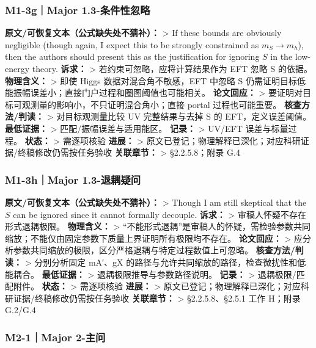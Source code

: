 \documentclass[
]{article}
\begin{document}
\subsubsection{M1-3g｜Major
1.3-条件性忽略}\label{m1-3gmajor-1.3-ux6761ux4ef6ux6027ux5ffdux7565}

\textbf{原文/可恢复文本（公式缺失处不猜补）：} \textgreater{} If these
bounds are obviously negligible (though again, I expect this to be
strongly constrained as \(m_S\to m_h\)), then the authors should present
this as the justification for ignoring \(S\) in the low-energy theory.
\textbf{诉求：} \textgreater{} 若约束可忽略，应将计算结果作为 EFT 忽略 S
的依据。 \textbf{物理含义：} \textgreater{} 即使 Higgs
数据对混合角不敏感，EFT 中忽略 S
仍需证明目标低能振幅误差小；直接门户过程和圈图阈值也可能相关。
\textbf{论文回应：} \textgreater{}
要证明对目标可观测量的影响小，不只证明混合角小；直接 portal
过程也可能重要。 \textbf{核查方法/判读：} \textgreater{}
对目标观测量比较 UV 完整结果与去掉 S 的 EFT，定义误差阈值。
\textbf{最低证据：} \textgreater{} 匹配/振幅误差与适用能区。
\textbf{记录：} \textgreater{} UV/EFT 误差与标量过程。 \textbf{状态：}
\textgreater{} 需逐项核验 \textbf{进展：} \textgreater{}
原文已登记；物理解释已深化；对应科研证据/终稿修改仍需按任务验收
\textbf{关联章节：} \textgreater{} §2.2.5.8；附录 G.4

\subsubsection{M1-3h｜Major
1.3-退耦疑问}\label{m1-3hmajor-1.3-ux9000ux8026ux7591ux95ee}

\textbf{原文/可恢复文本（公式缺失处不猜补）：} \textgreater{} Though I
am still skeptical that the \(S\) can be ignored since it cannot
formally decouple. \textbf{诉求：} \textgreater{}
审稿人怀疑不存在形式退耦极限。 \textbf{物理含义：} \textgreater{}
``不能形式退耦''是审稿人的怀疑，需检验参数共同缩放；不能仅由固定参数下质量上界证明所有极限均不存在。
\textbf{论文回应：} \textgreater{}
应分析参数共同缩放的极限，区分严格退耦与特定过程数值上可忽略。
\textbf{核查方法/判读：} \textgreater{} 分别分析固定 mA′、gX
的路径与允许共同缩放的路径，检查微扰性和低能耦合。 \textbf{最低证据：}
\textgreater{} 退耦极限推导与参数路径说明。 \textbf{记录：}
\textgreater{} 退耦极限/匹配附件。 \textbf{状态：} \textgreater{}
需逐项核验 \textbf{进展：} \textgreater{}
原文已登记；物理解释已深化；对应科研证据/终稿修改仍需按任务验收
\textbf{关联章节：} \textgreater{} §2.2.5.8、§2.5.1 工作 H；附录 G.2/G.4

\subsubsection{M2-1｜Major 2-主问}\label{m2-1major-2-ux4e3bux95ee}
\end{document}
